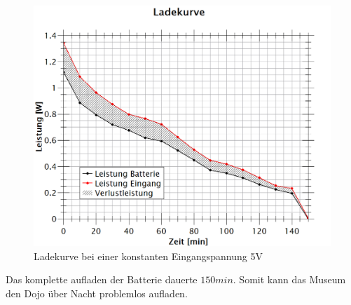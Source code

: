 \begin{figure}[htb]
	\centering
	\includegraphics[width=\textwidth]{graphics/ladekurve.png}
	\caption{Ladekurve bei einer konstanten Eingangspannung 5V}
	\label{fig:Ladeleistung}
\end{figure}


Das komplette aufladen der Batterie dauerte $150min$. Somit kann das Museum den Dojo über Nacht problemlos aufladen.